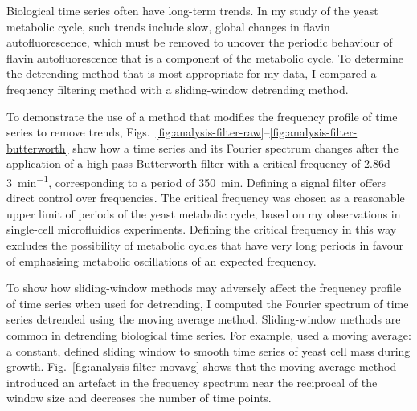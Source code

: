 Biological time series often have long-term trends.
In my study of the yeast metabolic cycle, such trends include slow, global changes in flavin autofluorescence, which must be removed to uncover the periodic behaviour of flavin autofluorescence that is a component of the metabolic cycle.
To determine the detrending method that is most appropriate for my data, I compared a frequency filtering method with a sliding-window detrending method.



To demonstrate the use of a method that modifies the frequency profile of time series to remove trends, Figs.\ \ref{fig:analysis-filter-raw}--\ref{fig:analysis-filter-butterworth} show how a time series and its Fourier spectrum changes after the application of a high-pass Butterworth filter with a critical frequency of \SI{2.86d-3}{\minute^{-1}}, corresponding to a period of \SI{350}{\minute}.
Defining a signal filter offers direct control over frequencies.
The critical frequency was chosen as a reasonable upper limit of periods of the yeast metabolic cycle, based on my observations in single-cell microfluidics experiments.
Defining the critical frequency in this way excludes the possibility of metabolic cycles that have very long periods in favour of emphasising metabolic oscillations of an expected frequency.

To show how sliding-window methods may adversely affect the frequency profile of time series when used for detrending, I computed the Fourier spectrum of time series detrended using the moving average method.
Sliding-window methods are common in detrending biological time series.
For example, \textcite{cunyHighresolutionMassMeasurements2022} used a moving average: a constant, defined sliding window to smooth time series of yeast cell mass during growth.
%
Fig.\ \ref{fig:analysis-filter-movavg} shows that the moving average method introduced an artefact in the frequency spectrum near the reciprocal of the window size and decreases the number of time points.

